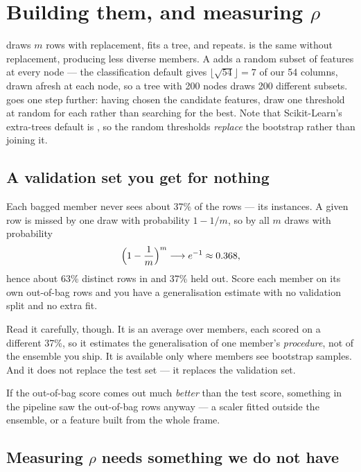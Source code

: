 \documentclass[11pt,a4paper]{article}
\begin{document}
\section{Building them, and measuring $\rho$}

 draws $m$ rows with replacement, fits a tree, and repeats.
 is the same without replacement, producing less diverse members.
A  adds a random subset of features at every node --- the
classification default  gives
$\lfloor\sqrt{54}\rfloor = 7$ of our 54 columns, drawn afresh at each node, so
a tree with 200 nodes draws 200 different subsets.  goes one
step further: having chosen the candidate features, draw one threshold at
random for each rather than searching for the best. Note that Scikit-Learn's
extra-trees default is , so the random thresholds
\emph{replace} the bootstrap rather than joining it.

\subsection{A validation set you get for nothing}

Each bagged member never sees about 37\% of the rows --- its 
instances. A given row is missed by one draw with probability $1 - 1/m$, so by
all $m$ draws with probability
\[ \Bigl(1 - \frac{1}{m}\Bigr)^{m} \longrightarrow e^{-1} \approx 0.368, \]
hence about 63\% distinct rows in and 37\% held out. Score each member on its
own out-of-bag rows and you have a generalisation estimate with no validation
split and no extra fit.

Read it carefully, though. It is an average over members, each scored on a
different 37\%, so it estimates the generalisation of one member's
\emph{procedure}, not of the ensemble you ship. It is available only where
members see bootstrap samples. And it does not replace the test set --- it
replaces the validation set.

\begin{keybox}[title={A leakage detector you get free}]
If the out-of-bag score comes out much \emph{better} than the test score,
something in the pipeline saw the out-of-bag rows anyway --- a scaler fitted
outside the ensemble, or a feature built from the whole frame.
\end{keybox}

\subsection{Measuring $\rho$ needs something we do not have}
\end{document}
